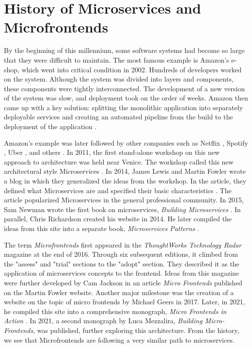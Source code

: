 \section{History of Microservices and Microfrontends}
By the beginning of this millennium, some software systems had become so large that they were difficult to maintain. The most famous example is Amazon's \cite{Amazon} e-shop, which went into critical condition in 2002. Hundreds of developers worked on the system. Although the system was divided into layers and components, these components were tightly interconnected. The development of a new version of the system was slow, and deployment took on the order of weeks. Amazon then came up with a key solution: splitting the monolithic application into separately deployable services and creating an automated pipeline from the build to the deployment of the application \cite{Brigham}.

Amazon's example was later followed by other companies such as Netflix \cite{Netflix}, Spotify \cite{Spotify}, Uber \cite{Uber}, and others \cite{Kwiecień}. In 2011, the first stand-alone workshop on this new approach to architecture was held near Venice. The workshop called this new architectural style {Microservices} \cite{Fowler}. In 2014, James Lewis and Martin Fowler wrote a blog in which they generalized the ideas from the workshop. In the article, they defined what Microservices are and specified their basic characteristics \cite{Fowler}. The article popularized Microservices in the general professional community. In 2015, Sam Newman wrote the first book on microservices, \emph{Building Microservices} \cite{NewmanBuildingMs}. In parallel, Chris Richardson created his website \cite{RichardsonWeb} in 2014. He later compiled the ideas from this site into a separate book, \emph{Microservices Patterns} \cite{RichardsonPatterns}.

The term \emph{Microfrontends} first appeared in the \emph{ThoughtWorks Technology Radar} magazine \cite{ThoughtWorksRadar} at the end of 2016. Through six subsequent editions, it climbed from the "assess" and "trial" sections to the "adopt" section. They described it as the application of microservices concepts to the frontend. Ideas from this magazine were further developed by Cam Jackson in an article \emph{Micro Frontends} published on the Martin Fowler website. Another major milestone was the creation of a website on the topic of micro frontends by Michael Geers \cite{GeersWeb} in 2017. Later, in 2021, he compiled this site into a comprehensive monograph, \emph{Micro Frontends in Action} \cite{Geers}. In 2021, a second monograph by Luca Mezzalira, \emph{Building Micro-Frontends}, was published, further exploring this architecture. From the history, we see that Microfrontends are following a very similar path to microservices.